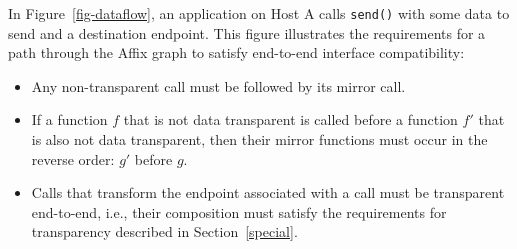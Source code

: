 In Figure~\ref{fig-dataflow}, an application on Host A
calls \texttt{send()} with some data to send and a destination
endpoint. This figure illustrates the requirements for 
a path through the Affix graph to satisfy
end-to-end interface compatibility:

\begin{itemize}
 \item Any non-transparent call must be followed by its mirror
 call.
 \item If a function $f$ that is not data transparent is called 
 before a function $f'$ that is also not data transparent, then 
 their mirror functions must occur in the reverse order: 
 $g'$ before $g$. 
\item Calls that transform the endpoint associated with a call
must be transparent end-to-end, i.e., their composition must 
satisfy the requirements for transparency described in 
Section~\ref{special}.
\end{itemize}








